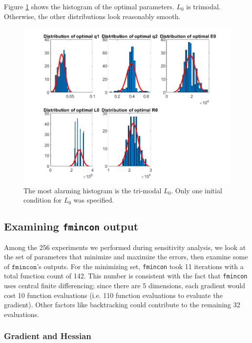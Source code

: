 \documentclass{article}
\begin{document}
Figure \ref{fig:Histo5} shows the histogram of the optimal parameters.  $L_0$ is trimodal.  Otherwise, the other distributions look reasonably smooth.

\begin{figure}
	\centering
	\includegraphics[scale=0.6]{Optimized parameter distribution across sensitivity analysisRun5}
	
	\caption{The most alarming histogram is the tri-modal $L_0$.  Only one initial condition for $L_0$ was specified.}
	
	\label{fig:Histo5}
\end{figure}

\subsection{Examining \texttt{fmincon} output}

Among the 256 experiments we performed during sensitivity analysis, we look at the set of parameters that minimize and maximize the errors, then examine some of $\texttt{fmincon}$'s outputs.  For the minimizing set, \texttt{fmincon} took 11 iterations with a total function count of 142.  This number is consistent with the fact that \texttt{fmincon} uses central finite differencing; since there are 5 dimensions, each gradient would cost 10 function evaluations (i.e. 110 function evaluations to evaluate the gradient).  Other factors like backtracking could contribute to the remaining 32 evaluations.

\subsubsection{Gradient and Hessian}
\end{document}
